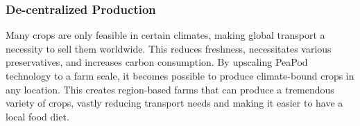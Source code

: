 \documentclass{report}
\begin{document}
\subsubsection{De-centralized Production} %
Many crops are only feasible in certain climates, making global transport a necessity to sell them worldwide. This reduces freshness, necessitates various preservatives, and increases carbon consumption. By upscaling PeaPod technology to a farm scale, it becomes possible to produce climate-bound crops in any location. This creates region-based farms that can produce a tremendous variety of crops, vastly reducing transport needs and making it easier to have a local food diet.




% 
% 
\end{document}
